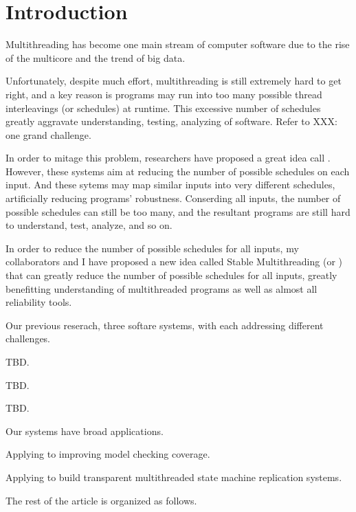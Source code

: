 \section{Introduction} \label{ch:intro}

Multithreading has become one main stream of computer software due to the rise 
of the multicore and the trend of big data.

Unfortunately, despite much effort, multithreading is still extremely hard to 
get right, and a key reason is programs may run into too many possible thread 
interleavings (or schedules) at runtime. This excessive number of schedules 
greatly aggravate understanding, testing, analyzing of software. Refer to XXX: 
one grand challenge.

In order to mitage this problem, researchers have proposed a great idea call 
\dmt. However, these systems aim at reducing the number of possible schedules 
on each input. And these sytems may map similar inputs into very different 
schedules, artificially reducing programs' robustness. Conserding all inputs, 
the number of possible schedules can still be too many, and the resultant 
programs are still hard to understand, test, analyze, and so on.

In order to reduce the number of possible schedules for all inputs, my collaborators and I have 
proposed a new idea called Stable Multithreading (or \smt) that can greatly 
reduce the number of possible schedules for all inputs, greatly benefitting 
understanding of multithreaded programs as well as almost all reliability tools.

Our previous reserach, three softare systems, with each addressing different 
challenges.

\tern TBD.

\peregrine TBD.

\parrot TBD.

Our \smt systems have broad applications.

Applying \smt to improving model checking coverage.

Applying \smt to build transparent multithreaded state machine replication systems.

The rest of the article is organized as follows.


